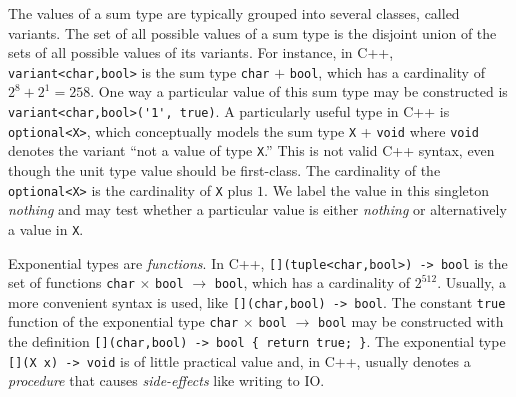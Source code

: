 \documentclass[11pt,final,hidelinks]{article}
\theoremstyle{plain}
\newenvironment{remark}
  {\pushQED{\qed}\renewcommand{\qedsymbol}{$\triangle$}\remarkx}
  {\popQED\endremarkx}
\begin{document}
The values of a sum type are typically grouped into several classes, called variants.
The set of all possible values of a sum type is the disjoint union of the sets of all possible values of its variants.
For instance, in C++, \lstinline{variant<char,bool>}
is the sum type \lstinline{char} $+$ \lstinline{bool}, which has a cardinality of $2^8 + 2^1 = 258$.
One way a particular value of this sum type may be constructed is \lstinline{variant<char,bool>('1', true)}.
A particularly useful type in C++ is \lstinline{optional<X>}, which conceptually models the sum type \lstinline{X} + \lstinline{void} where \lstinline{void} denotes the variant ``not a value of type \lstinline{X}.''
\begin{remark}
This is not valid C++ syntax, even though the unit type value should be first-class.
\end{remark}
The cardinality of the \lstinline{optional<X>} is the cardinality of \lstinline{X} plus $1$.
We label the value in this singleton \emph{nothing} and may test whether a particular value is either \emph{nothing} or alternatively a value in \lstinline{X}.

Exponential types are \emph{functions}.
In C++, \lstinline{[](tuple<char,bool>) -> bool} is the set of functions \lstinline{char} $\times$ \lstinline{bool} $\to$ \lstinline{bool}, which has a cardinality of $2^{512}$.
Usually, a more convenient syntax is used, like \lstinline|[](char,bool) -> bool|.
The constant \lstinline|true| function of the exponential type \lstinline|char| $\times$ \lstinline|bool| $\to$ \lstinline|bool| may be constructed with the definition \lstinline|[](char,bool) -> bool { return true; }|.
\begin{remark}
The exponential type \lstinline{[](X x) -> void} is of little practical value and, in C++, usually denotes a \emph{procedure} that causes \emph{side-effects} like writing to IO.
\end{remark}
\end{document}
